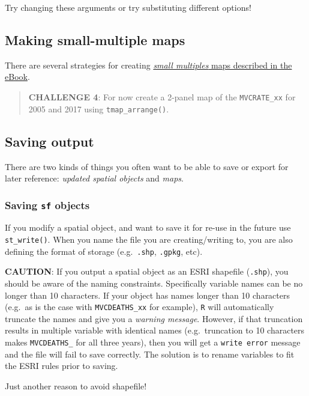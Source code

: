 \documentclass[
]{book}
\newenvironment{rmdcaution}[1]
  {
  \begin{itemize}
  \renewcommand{\labelitemi}{
    \raisebox{-.7\height}[0pt][0pt]{
      {\setkeys{Gin}{width=3em,keepaspectratio}\texttt{[image: images/\#1]}}
    }
  }
  \setlength{\fboxsep}{1em}
  \begin{caution}
  \item
  }
  {
  \end{caution}
  \end{itemize}
  }
\begin{document}
Try changing these arguments or try substituting different options!

\hypertarget{making-small-multiple-maps-1}{%
\subsection{Making small-multiple maps}\label{making-small-multiple-maps-1}}

There are several strategies for creating \href{https://mkram01.github.io/EPI563-SpatialEPI/intro-tmap.html\#making-small-multiple-maps}{\emph{small multiples} maps described in the eBook}.

\begin{quote}
\textbf{CHALLENGE 4}: For now create a 2-panel map of the \texttt{MVCRATE\_xx} for 2005 and 2017 using \texttt{tmap\_arrange()}.
\end{quote}

\hypertarget{saving-output}{%
\subsection{Saving output}\label{saving-output}}

There are two kinds of things you often want to be able to save or export for later reference: \emph{updated spatial objects} and \emph{maps}.

\hypertarget{saving-sf-objects}{%
\subsubsection{\texorpdfstring{Saving \texttt{sf} objects}{Saving sf objects}}\label{saving-sf-objects}}

If you modify a spatial object, and want to save it for re-use in the future use \texttt{st\_write()}. When you name the file you are creating/writing to, you are also defining the format of storage (e.g.~\texttt{.shp}, \texttt{.gpkg}, etc).

\begin{rmdcaution}{caution}
\textbf{CAUTION}: If you output a spatial object as an ESRI shapefile (\texttt{.shp}), you should be aware of the naming constraints. Specifically variable names can be no longer than 10 characters. If your object has names longer than 10 characters (e.g.~as is the case with \texttt{MVCDEATHS\_xx} for example), \texttt{R} will automatically truncate the names and give you a \emph{warning message}. However, if that truncation results in multiple variable with identical names (e.g.~truncation to 10 characters makes \texttt{MVCDEATHS\_} for all three years), then you will get a \texttt{write\ error} message and the file will fail to save correctly. The solution is to rename variables to fit the ESRI rules prior to saving.

Just another reason to avoid shapefile!

\end{rmdcaution}
\end{document}
